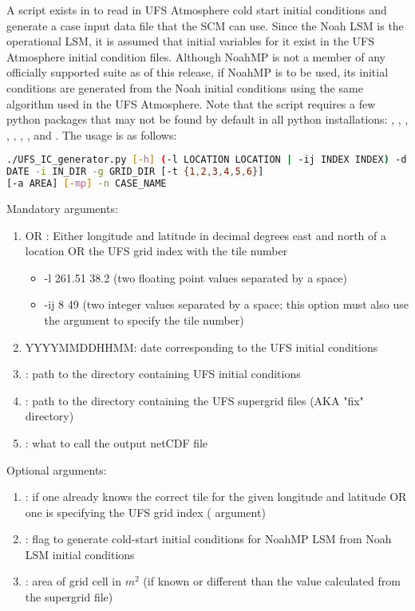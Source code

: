 A script exists in  to read in UFS Atmosphere cold start initial conditions and generate a case input data file that the SCM can use. Since the Noah LSM is the operational LSM, it is assumed that initial variables for it exist in the UFS Atmosphere initial condition files. Although NoahMP is not a member of any officially supported suite as of this release, if NoahMP is to be used, its initial conditions are generated from the Noah initial conditions using the same algorithm used in the UFS Atmosphere. Note that the script requires a few python packages that may not be found by default in all python installations: , , , , , , , and . The usage is as follows:

\begin{lstlisting}[language=bash]
./UFS_IC_generator.py [-h] (-l LOCATION LOCATION | -ij INDEX INDEX) -d
DATE -i IN_DIR -g GRID_DIR [-t {1,2,3,4,5,6}]
[-a AREA] [-mp] -n CASE_NAME
\end{lstlisting}

Mandatory arguments:
\begin{enumerate}
\item {} OR :  Either longitude and latitude in decimal degrees east and north of a location OR the UFS grid index with the tile number
	\begin{itemize}
		\item -l 261.51 38.2 (two floating point values separated by a space)
		\item -ij 8 49 (two integer values separated by a space; this option must also use the  argument to specify the tile number)
	\end{itemize}
\item {} YYYYMMDDHHMM: date corresponding to the UFS initial conditions
\item {}: path to the directory containing UFS initial conditions
\item {}: path to the directory containing the UFS supergrid files (AKA "fix" directory)
\item {}: what to call the output netCDF file
\end{enumerate}

Optional arguments:
\begin{enumerate}
\item {}: if one already knows the correct tile for the given longitude and latitude OR one is specifying the UFS grid index ( argument)
\item {}: flag to generate cold-start initial conditions for NoahMP LSM from Noah LSM initial conditions
\item {}: area of grid cell in $m^2$ (if known or different than the value calculated from the supergrid file)
\end{enumerate}


